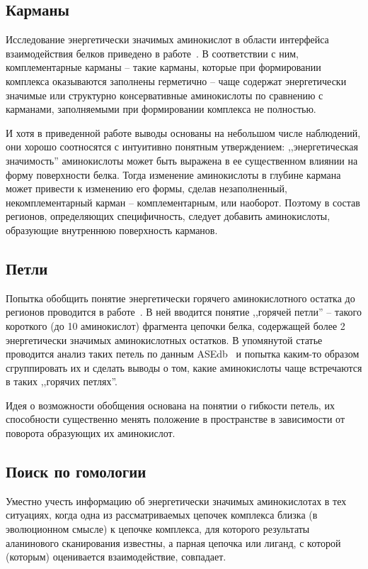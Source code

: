 \subsection{Карманы}
Исследование энергетически значимых аминокислот в области интерфейса взаимодействия белков приведено в работе~\cite{pockets2004}. В соответствии с ним, комплементарные карманы -- такие карманы, которые при формировании комплекса оказываются заполнены герметично -- чаще содержат энергетически значимые или структурно консервативные аминокислоты по сравнению с карманами, заполняемыми при формировании комплекса не полностью.

И хотя в приведенной работе выводы основаны на небольшом числе наблюдений, они хорошо соотносятся с интуитивно понятным утверждением: ,,энергетическая значимость'' аминокислоты может быть выражена в ее существенном влиянии на форму поверхности белка. Тогда изменение аминокислоты в глубине кармана может привести к изменению его формы, сделав незаполненный, некомплементарный карман -- комплементарным, или наоборот. Поэтому в состав регионов, определяющих специфичность, следует добавить аминокислоты, образующие внутреннюю поверхность карманов.
\subsection{Петли}
Попытка обобщить понятие энергетически горячего аминокислотного остатка до регионов проводится в работе~\cite{loops2014}. В ней вводится понятие ,,горячей петли'' -- такого короткого (до 10 аминокислот) фрагмента  цепочки белка, содержащей более 2 энергетически значимых аминокислотных остатков. В упомянутой статье проводится анализ таких петель по данным ASEdb~\cite{asedb2001} и попытка каким-то образом сгруппировать их и сделать выводы о том, какие аминокислоты чаще встречаются в таких ,,горячих петлях''.

Идея о возможности обобщения основана на понятии о гибкости петель, их способности существенно менять положение в пространстве в зависимости от поворота образующих их аминокислот.

\subsection{Поиск по гомологии}
Уместно учесть информацию об энергетически значимых аминокислотах в тех ситуациях, когда одна из рассматриваемых цепочек комплекса близка (в эволюционном смысле) к цепочке комплекса, для которого результаты аланинового сканирования известны, а парная цепочка или лиганд, с которой (которым) оценивается взаимодействие, совпадает.

